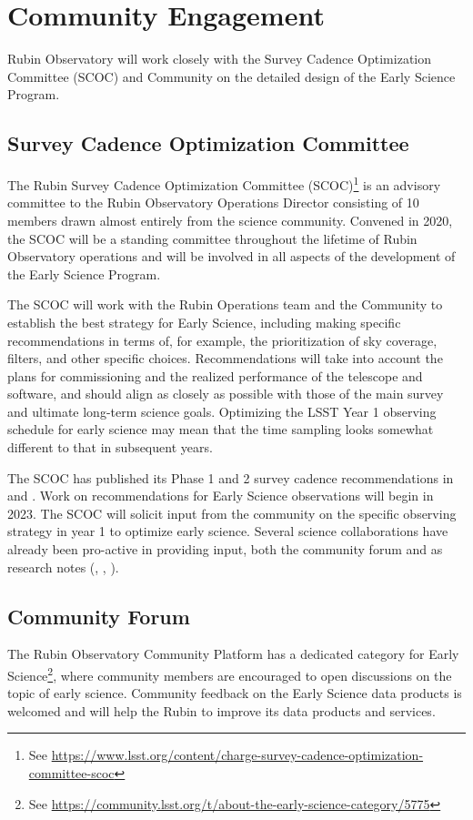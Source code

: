 \section{Community Engagement}

Rubin Observatory will work closely with the Survey Cadence Optimization Committee (SCOC) and Community on the detailed design of the Early Science Program. 

\subsection{Survey Cadence Optimization Committee}
The Rubin Survey Cadence Optimization Committee (SCOC)\footnote{See \url{https://www.lsst.org/content/charge-survey-cadence-optimization-committee-scoc}} is an advisory committee to the Rubin Observatory Operations Director consisting of 10 members drawn almost entirely from the science community.
Convened in 2020, the SCOC will be a standing committee throughout the lifetime of Rubin Observatory operations and will be involved in all aspects of the development of the Early Science Program. 

The SCOC will work with the Rubin Operations team and the Community to establish the best strategy for Early Science, including making specific recommendations in terms of, for example, the prioritization of sky coverage, filters, and other specific choices. 
Recommendations will take into account the plans for commissioning and the realized performance of the telescope and software, and should align as closely as possible with those of the main survey and ultimate long-term science goals. 
Optimizing the LSST Year 1 observing schedule for early science may mean that the time sampling looks somewhat different to that in subsequent years. 

The SCOC has published its Phase 1 and 2 survey cadence recommendations in  and . 
Work on recommendations for Early Science observations will begin in 2023.
The SCOC will solicit input from the community on the specific observing strategy in year 1 to optimize early science. 
Several science collaborations have already been pro-active in providing input,  both the community forum and as research notes (\citep{2020arXiv201005926L}, \citep{Hambleton_2020}, \citep{Street_2020}).


\subsection{Community Forum}

The Rubin Observatory Community Platform has a dedicated category for Early Science\footnote{See \url{https://community.lsst.org/t/about-the-early-science-category/5775}}, where community members are encouraged to open discussions on the topic of early science. 
Community feedback on the Early Science data products is welcomed and will help the Rubin to improve its data products and services. 
